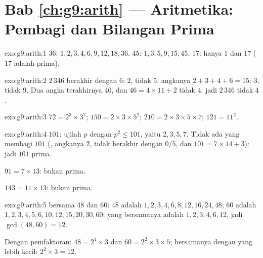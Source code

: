 \section*{Bab \ref{ch:g9:arith} --- Aritmetika: Pembagi dan Bilangan Prima}

\begin{solution}{exo:g9:arith:1}
 $36$: $1, 2, 3, 4, 6, 9, 12, 18, 36$.
 $45$: $1, 3, 5, 9, 15, 45$.
 $17$: hanya $1$ dan $17$ ($17$ adalah prima).
\end{solution}

\begin{solution}{exo:g9:arith:2}
$2\,346$ berakhir dengan $6$:  $2$, tidak 
$5$.  angkanya $2 + 3 + 4 + 6 = 15$:  $3$, tidak
 $9$. Dua angka terakhirnya
$46$, dan $46 = 4 \times 11 + 2$ tidak  $4$: jadi
$2\,346$ tidak  $4$.
\end{solution}

\begin{solution}{exo:g9:arith:3}
$72 = 2^3 \times 3^2$; \quad
$150 = 2 \times 3 \times 5^2$; \quad
$210 = 2 \times 3 \times 5 \times 7$; \quad
$121 = 11^2$.
\end{solution}

\begin{solution}{exo:g9:arith:4}
$101$: ujilah  $p$ dengan $p^2 \leq 101$, yaitu
$2, 3, 5, 7$. Tidak ada yang membagi $101$ (,  angkanya
$2$, tidak berakhir dengan $0/5$, dan
$101 = 7 \times 14 + 3$): jadi $101$ prima.

$91 = 7 \times 13$: bukan prima.

$143 = 11 \times 13$: bukan prima.
\end{solution}

\begin{solution}{exo:g9:arith:5}
 bersama $48$ dan $60$:  48 adalah $1, 2, 3, 4, 6, 8,
12, 16, 24, 48$;  $60$ adalah $1, 2, 3, 4, 5, 6, 10, 12, 15,
20, 30, 60$; yang bersamanya adalah $1, 2, 3, 4, 6, 12$, jadi
$\gcd(48,60) = 12$.

Dengan pemfaktoran: $48 = 2^4 \times 3$ dan
$60 = 2^2 \times 3 \times 5$;  bersamanya dengan
 yang lebih kecil: $2^2 \times 3 = 12$.
\end{solution}

